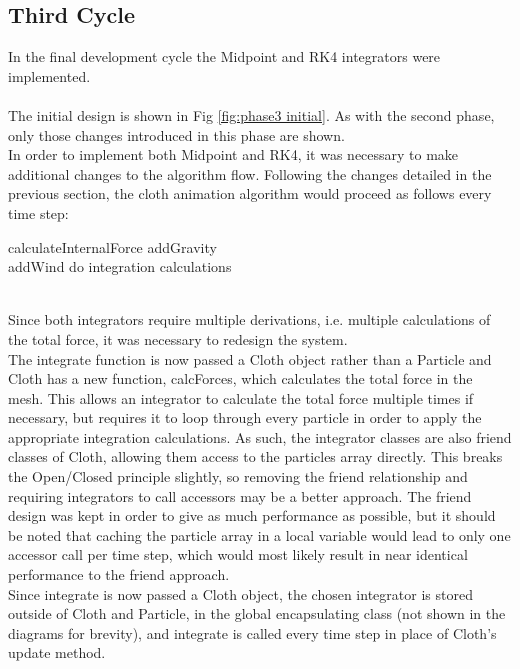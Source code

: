 \subsection{Third Cycle}
In the final development cycle the Midpoint and RK4 integrators were implemented.
\\\\The initial design is shown in Fig \ref{fig:phase3 initial}. As with the second phase, only those changes introduced in this phase are shown.
\\In order to implement both Midpoint and RK4, it was necessary to make additional changes to the algorithm flow. Following the changes detailed in the previous section, the cloth animation algorithm would proceed as follows every time step:
\begin{algorithm}[h]
  \SetAlgoLined
  \SetNoFillComment
   {
    calculateInternalForce
  }
   {
    addGravity
    \\ {
      addWind
    }
    do integration calculations
  }
\end{algorithm}
\\Since both integrators require multiple derivations, i.e. multiple calculations of the total force, it was necessary to redesign the system.
\\The integrate function is now passed a Cloth object rather than a Particle and Cloth has a new function, calcForces, which calculates the total force in the mesh. This allows an integrator to calculate the total force multiple times if necessary, but requires it to loop through every particle in order to apply the appropriate integration calculations. As such, the integrator classes are also friend classes of Cloth, allowing them access to the particles array directly. This breaks the Open/Closed principle slightly, so removing the friend relationship and requiring integrators to call accessors may be a better approach. The friend design was kept in order to give as much performance as possible, but it should be noted that caching the particle array in a local variable would lead to only one accessor call per time step, which would most likely result in near identical performance to the friend approach.
\\Since integrate is now passed a Cloth object, the chosen integrator is stored outside of Cloth and Particle, in the global encapsulating class (not shown in the diagrams for brevity), and integrate is called every time step in place of Cloth's update method.

